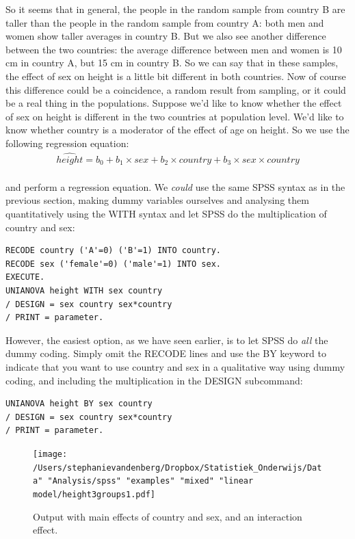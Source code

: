 \documentclass[]{report}\usepackage[]{graphicx}\usepackage[]{color}
\begin{document}
So it seems that in general, the people in the random sample from country B are taller than the people in the random sample from country A: both men and women show taller averages in country B. But we also see another difference between the two countries: the average difference between men and women is 10 cm in country A, but 15 cm in country B. So we can say that in these samples, the effect of sex on height is a little bit different in both countries. Now of course this difference could be a coincidence, a random result from sampling, or it could be a real thing in the populations. Suppose we'd like to know whether the effect of sex on height is different in the two countries at population level. We'd like to know whether country is a moderator of the effect of age on height. So we use the following regression equation:
\\
\begin{eqnarray} 
\widehat{height} = b_0 + b_1  \times sex + b_2 \times country +  b_3 \times sex \times country  \nonumber
\end{eqnarray}
\\
and perform a regression equation. We \textit{could} use the same SPSS syntax as in the previous section, making dummy variables ourselves and analysing them quantitatively using the WITH syntax and let SPSS do the multiplication of country and sex:
\begin{verbatim}
RECODE country ('A'=0) ('B'=1) INTO country.
RECODE sex ('female'=0) ('male'=1) INTO sex.
EXECUTE.
UNIANOVA height WITH sex country 
/ DESIGN = sex country sex*country
/ PRINT = parameter.
\end{verbatim}

However, the easiest option, as we have seen earlier, is to let SPSS do \textit{all} the dummy coding. Simply omit the RECODE lines and use the BY keyword to indicate that you want to use country and sex in a qualitative way using dummy coding, and including the multiplication in the DESIGN subcommand:

\begin{verbatim}
UNIANOVA height BY sex country 
/ DESIGN = sex country sex*country
/ PRINT = parameter.
\end{verbatim}





\begin{figure}[h]
    \begin{center}
       \texttt{[image: /Users/stephanievandenberg/Dropbox/Statistiek\_Onderwijs/Data" "Analysis/spss" "examples" "mixed" "linear model/height3groups1.pdf]}
    \end{center}
    \label{fig:interactionheightcountrysex}
    \caption{Output with main effects of country and sex, and an interaction effect.}
\end{figure}
\end{document}
